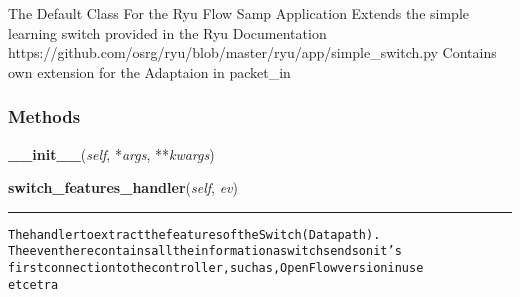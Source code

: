 The Default Class For the Ryu Flow Samp Application Extends the simple 
learning switch provided in the Ryu Documentation 
https://github.com/osrg/ryu/blob/master/ryu/app/simple\_switch.py Contains 
own extension for the Adaptaion in packet\_in



  \subsubsection{Methods}

    \label{FlowSamp:FlowSampRyu:controller:flow_samp:FlowSamp:__init__}

    \vspace{0.5ex}

\hspace{.8\funcindent}\begin{boxedminipage}{\funcwidth}

    \raggedright \textbf{\_\_init\_\_}(\textit{self}, *\textit{args}, **\textit{kwargs})

\setlength{\parskip}{2ex}
\setlength{\parskip}{1ex}
    \end{boxedminipage}

    \label{FlowSamp:FlowSampRyu:controller:flow_samp:FlowSamp:switch_features_handler}

    \vspace{0.5ex}

\hspace{.8\funcindent}\begin{boxedminipage}{\funcwidth}

    \raggedright \textbf{switch\_features\_handler}(\textit{self}, \textit{ev})

    \vspace{-1.5ex}

    \rule{\textwidth}{0.5\fboxrule}
\setlength{\parskip}{2ex}
\begin{alltt}
The handler to extract the features of the Switch (Datapath).
 The event here contains all the information a switch sends on it's
first connection to the controller, such as, OpenFlow version in use
et cetra
\end{alltt}

\setlength{\parskip}{1ex}
    \end{boxedminipage}

